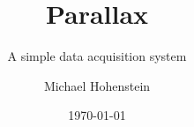 \documentclass{include/documentclass}
\title{Parallax}
\subtitle{A simple data acquisition system}
\author{Michael Hohenstein}
\date{\today}
\begin{document}
	\titlepage{
		\maketitle
	}
	\clearpage
	\tableofcontents
	\listoftodos
	\clearpage

	
\end{document}
